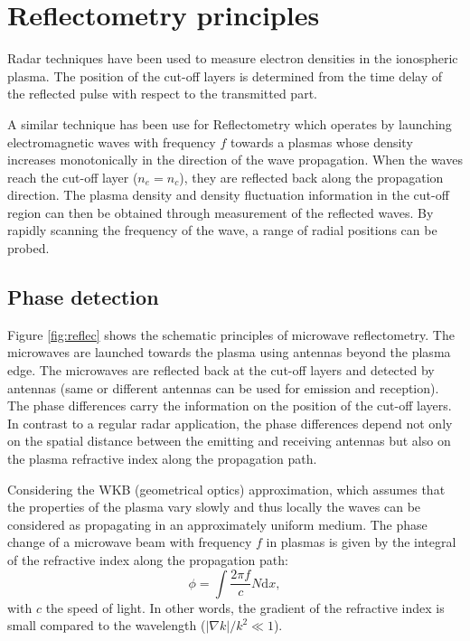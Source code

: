 \section{Reflectometry principles} \label{sec:reflectometry_principles}


Radar techniques have been used to measure electron densities in the ionospheric plasma. The position of the cut-off layers is determined from the time delay of the reflected pulse with respect to the transmitted part.

A similar technique has been use for Reflectometry which operates by launching electromagnetic waves with frequency $f$ towards a plasmas whose density increases monotonically in the direction of the wave propagation. When the waves reach the cut-off layer ($n_e = n_c$), they are reflected back along the propagation direction. The plasma density and density fluctuation information in the cut-off region can then be obtained through measurement of the reflected waves. By rapidly scanning the frequency of the wave, a range of radial positions can be probed.




\subsection{Phase detection} \label{sec:phase_detection}


Figure \ref{fig:reflec} shows the schematic principles of microwave reflectometry. The microwaves are launched towards the plasma using antennas beyond the plasma edge. The microwaves are reflected back at the cut-off layers and detected by antennas (same or different antennas can be used for emission and reception). The phase differences carry the information on the position of the cut-off layers. In contrast to a regular radar application, the phase differences depend not only on the spatial distance between the emitting and receiving antennas but also on the plasma refractive index along the propagation path.


Considering the WKB (geometrical optics) approximation, which assumes that the properties of the plasma vary slowly and thus locally the waves can be considered as propagating in an approximately uniform medium. The phase change of a microwave beam with frequency $f$ in plasmas is given by the integral of the refractive index along the propagation path:%
\begin{equation}\label{eq:phase_WKB}
  \phi=\int \frac{2{\pi}f}{c}N\mathrm{d}x,
\end{equation}
\noindent with $c$ the speed of light. In other words, the gradient of the refractive index is small compared to the wavelength ($|\nabla k|/k^2 \ll 1$).


